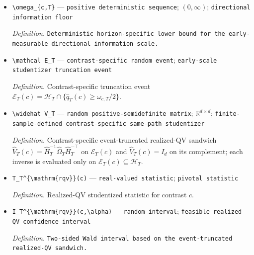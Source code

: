 \documentclass{article}
\begin{document}
\begin{itemize}
  \par\smallskip\noindent\emph{Definition.} Total feasible contrast variance: \(\widehat q_T(c)=c^\top\widehat H_T^{-1}\widehat\Omega_T\widehat H_T^{-\top}c\) on \(\mathcal H_T\), with the inverse evaluated only there, and \(\widehat q_T(c)=0\) on \(\mathcal H_T^c\).
  \item \texttt{\textbackslash{}\allowbreak{}omega\_\allowbreak{}\{c,\allowbreak{}T\}\allowbreak{}} --- \texttt{positive deterministic sequence}; \((0,\infty)\); \texttt{directional information floor}
  \par\smallskip\noindent\emph{Definition.} \texttt{Deterministic horizon-\allowbreak{}specific lower bound for the early-\allowbreak{}measurable directional information scale.}
  \item \texttt{\textbackslash{}\allowbreak{}mathcal E\_\allowbreak{}T} --- \texttt{contrast-\allowbreak{}specific random event}; \texttt{early-\allowbreak{}scale studentizer truncation event}
  \par\smallskip\noindent\emph{Definition.} Contrast-specific truncation event \(\mathcal E_T(c)=\mathcal H_T\cap\{\widehat q_T(c)\ge\omega_{c,T}/2\}\).
  \item \texttt{\textbackslash{}\allowbreak{}widehat V\_\allowbreak{}T} --- \texttt{random positive-\allowbreak{}semidefinite matrix}; \(\mathbb R^{d\times d}\); \texttt{finite-\allowbreak{}sample-\allowbreak{}defined contrast-\allowbreak{}specific same-\allowbreak{}path studentizer}
  \par\smallskip\noindent\emph{Definition.} Contrast-specific event-truncated realized-QV sandwich \(\widehat V_T(c)=\widehat H_T^{-1}\widehat\Omega_T\widehat H_T^{-\top}\) on \(\mathcal E_T(c)\) and \(\widehat V_T(c)=I_d\) on its complement; each inverse is evaluated only on \(\mathcal E_T(c)\subseteq\mathcal H_T\).
  \item \texttt{T\_\allowbreak{}T\textasciicircum{}\{\textbackslash{}\allowbreak{}mathrm\{rqv\}\allowbreak{}\}\allowbreak{}(c)} --- \texttt{real-\allowbreak{}valued statistic}; \texttt{pivotal statistic}
  \par\smallskip\noindent\emph{Definition.} Realized-QV studentized statistic for contrast \(c\).
  \item \texttt{I\_\allowbreak{}T\textasciicircum{}\{\textbackslash{}\allowbreak{}mathrm\{rqv\}\allowbreak{}\}\allowbreak{}(c,\allowbreak{}\textbackslash{}\allowbreak{}alpha)} --- \texttt{random interval}; \texttt{feasible realized-\allowbreak{}QV confidence interval}
  \par\smallskip\noindent\emph{Definition.} \texttt{Two-\allowbreak{}sided Wald interval based on the event-\allowbreak{}truncated realized-\allowbreak{}QV sandwich.}

\end{itemize}
\end{document}
